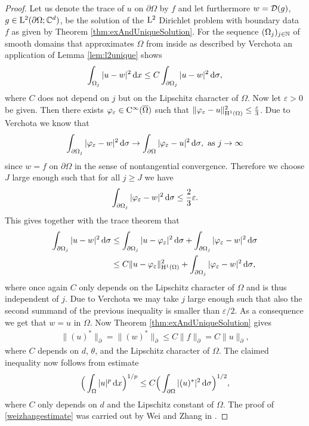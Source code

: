 \begin{proof}
  Let us denote the trace of $u$ on $\partial\Omega$ by $f$ and let furthermore $w = \mathcal{D}(g)$, $g \in \mathrm{L}^2(\partial\Omega; \mathbb{C}^d)$, be the solution of the $\mathrm{L}^2$ Dirichlet problem with boundary data $f$ as given by Theorem \ref{thm:exAndUniqueSolution}.
  For the sequence $(\Omega_j)_{j \in \mathbb{N}}$ of smooth domains that approximates $\Omega$ from inside as described by Verchota \cite{verchotaDiss} an application of Lemma \ref{lem:l2unique} shows
  \begin{align}
    \int_{\Omega_j} |u - w|^2 \, {\operatorname{d}\!{x}} \leq C \int_{\partial\Omega_j} |u - w|^2 \, {\operatorname{d}\!{\sigma}},
  \end{align}
  where $C$ does not depend on $j$ but on the Lipschitz character of $\Omega$.
  Now let $\varepsilon > 0$ be given. 
  Then there exists $\varphi_\varepsilon \in \mathrm{C}^\infty(\overline\Omega)$ such that $\|\varphi_\varepsilon - u\|_{\mathrm{H}^1(\Omega)}^2 \leq \frac{\varepsilon}{3}$.
  Due to Verchota we know that 
  \begin{align*}
    \int_{\partial\Omega_j} |\varphi_\varepsilon - w|^2 \, {\operatorname{d}\!{\sigma}} \to \int_{\partial\Omega} |\varphi_\varepsilon - u|^2 \, {\operatorname{d}\!{\sigma}}, \text{ as } j \to \infty
  \end{align*}
  since $w = f$ on $\partial\Omega$ in the sense of nontangential convergence.
  Therefore we choose $J$ large enough such that for all $j \geq J$ we have
  \begin{align*}
    \int_{\partial\Omega_j} |\varphi_\varepsilon - w|^2 \, {\operatorname{d}\!{\sigma}} \leq \frac{2}{3} \varepsilon.
  \end{align*}
  This gives together with the trace theorem that
  \begin{align*}
    \int_{\partial\Omega_j} |u - w|^2 \, {\operatorname{d}\!{\sigma}} 
    &\leq \int_{\partial\Omega_j} |u - \varphi_\varepsilon |^2 \, {\operatorname{d}\!{\sigma}} + \int_{\partial\Omega_j} |\varphi_\varepsilon - w|^2 \, {\operatorname{d}\!{\sigma}} \\
    &\leq C \| u - \varphi_\varepsilon \|_{\mathrm{H}^1(\Omega)}^2 + \int_{\partial\Omega_j} |\varphi_\varepsilon - w|^2 \, {\operatorname{d}\!{\sigma}},
  \end{align*}
  where once again $C$ only depends on the Lipschitz character of $\Omega$ and is thus independent of $j$.
  Due to Verchota \cite{verchota} we may take $j$ large enough such that also the second summand of the previous inequality is smaller than $\varepsilon/2$.
  As a consequence we get that $w = u$ in $\Omega$.
  Now Theorem \ref{thm:exAndUniqueSolution} gives
  \begin{align*}
    \| (u)^* \|_\partial = \| (w)^* \|_\partial \leq C \| f\|_\partial = C \|u\|_\partial,
  \end{align*}
  where $C$ depends on $d$, $\theta$, and the Lipschitz character of $\Omega$.
  The claimed inequality now follows from estimate
  \begin{align}
    \label{weizhangestimate}
    \Big( \int_\Omega |u|^p \, {\operatorname{d}\!{x}} \Big)^{1/p} \leq C \Big( \int_{\partial\Omega} |(u)^*|^2 \, {\operatorname{d}\!{\sigma}} \Big)^{1/2},
  \end{align}
  where $C$ only depends on $d$ and the Lipschitz constant of $\Omega$.
  The proof of \eqref{weizhangestimate} was carried out by Wei and Zhang in \cite{weiZhang}.
\end{proof}

